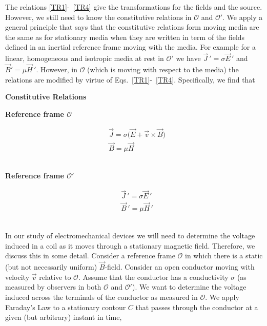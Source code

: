 \documentclass[11pt,a4paper,oneside]{book}
\numberwithin{equation}{section}
\theoremstyle{it}
\theoremstyle{definition}
\begin{document}
The relations \ref{TR1}-~\ref{TR4} give the transformations for the fields and the source. However, we still need to know the constitutive relations in $\mathcal{O}$ and $\mathcal{O'}$. We apply a general principle that says that the constitutive relations form moving media are the same as for stationary media when they are written in term of the fields defined in an inertial reference frame moving with the media. For example for a linear, homogeneous and isotropic media at rest in $\mathcal{O'}$ we have $\vec{J}\,' = \sigma\vec{E}\,'$ and $\vec{B}'=\mu\vec{H}\,'$. However, in $\mathcal{O}$ (which is moving with respect to the media) the relations are modified by virtue of Eqs.~\eqref{TR1}-~\ref{TR4}. Specifically, we find that
\setlength{\columnseprule}{1pt}
\bigskip
\ \newline \centerline{\textbf{Constitutive Relations}}
\begin{multicols}{2}
	\centerline{\textbf{Reference frame $\mathcal{O}$}}	
	\begin{equation*}
		\begin{aligned}
			&\vec{J} =  \sigma\big(\vec{E}+\vec{v}\times\vec{B}\big) \\[8pt]
			&\vec{B} =  \mu\vec{H}
		\end{aligned}
	\end{equation*} 
	\ \newline
	\columnbreak
	\ \newline
	\centerline{\textbf{Reference frame $\mathcal{O'}$}}	
	\begin{equation}
		\begin{aligned}
			&\vec{J}\,' =  \sigma\vec{E}\,' \\[8pt]
			&\vec{B}\,' =  \mu\vec{H}\,'
		\end{aligned}
	\end{equation} 
	\ \newline
\end{multicols}
In our study of electromechanical devices we will need to determine the voltage induced in a coil as it moves through a stationary magnetic field. Therefore, we discuss this in some detail. Consider a reference frame $\mathcal{O}$ in which there is a static (but not necessarily uniform) $\vec{B}$-field. Consider an open conductor moving with velocity $\vec{v}$ relative to $\mathcal{O}$. Assume that the conductor has a conductivity $\sigma$ (as measured by observers in both $\mathcal{O}$ and $\mathcal{O}'$). We want to determine the voltage induced across the terminals of the conductor as measured in $\mathcal{O}$. We apply Faraday's Law to a stationary contour $C$ that passes through the conductor at a given (but arbitrary) instant in time,
\end{document}
